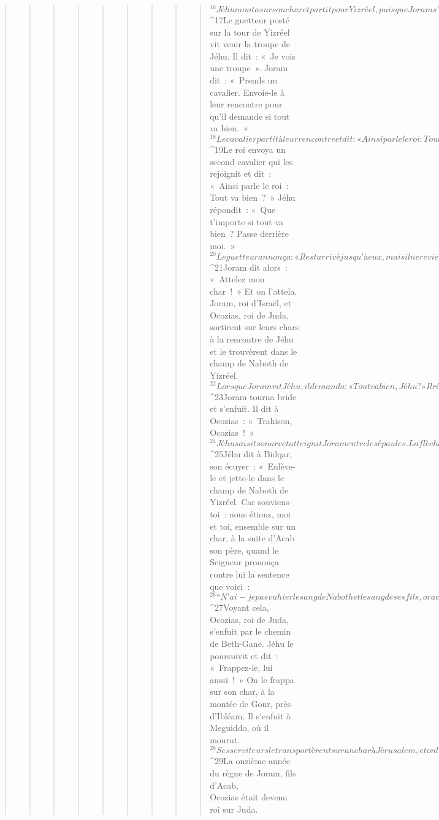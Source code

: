 \begin{verse}
\begin{verse}
\begin{verse}
\begin{verse}
\begin{verse}
\begin{verse}
\begin{verse}
\begin{verse}
\begin{verse}
${}^{16}Jéhu monta sur son char et partit pour Yizréel, puisque Joram s’y trouvait alité. Ocozias, roi de Juda, était descendu voir Joram. 
${}^{17}Le guetteur posté sur la tour de Yizréel vit venir la troupe de Jéhu. Il dit : « Je vois une troupe ». Joram dit : « Prends un cavalier. Envoie-le à leur rencontre pour qu’il demande si tout va bien. » 
${}^{18}Le cavalier partit à leur rencontre et dit : « Ainsi parle le roi : Tout va bien ? » Jéhu répondit : « Que t’importe si tout va bien ? Passe derrière moi. » Le guetteur annonça : « Le messager est arrivé jusqu’à eux, mais il ne revient pas. » 
${}^{19}Le roi envoya un second cavalier qui les rejoignit et dit : « Ainsi parle le roi : Tout va bien ? » Jéhu répondit : « Que t’importe si tout va bien ? Passe derrière moi. » 
${}^{20}Le guetteur annonça : « Il est arrivé jusqu’à eux, mais il ne revient pas. La façon de conduire le char est celle de Jéhu, fils de Namsi, car il conduit comme un fou ! » 
${}^{21}Joram dit alors : « Attelez mon char ! » Et on l’attela. Joram, roi d’Israël, et Ocozias, roi de Juda, sortirent sur leurs chars à la rencontre de Jéhu et le trouvèrent dans le champ de Naboth de Yizréel. 
${}^{22}Lorsque Joram vit Jéhu, il demanda : « Tout va bien, Jéhu ? » Il répondit : « Est-il possible que tout aille bien, aussi longtemps que durent les débauches de ta mère Jézabel et ses nombreuses sorcelleries ? » 
${}^{23}Joram tourna bride et s’enfuit. Il dit à Ocozias : « Trahison, Ocozias ! » 
${}^{24}Jéhu saisit son arc et atteignit Joram entre les épaules. La flèche lui transperça le cœur, et il s’écroula dans son char. 
${}^{25}Jéhu dit à Bidqar, son écuyer : « Enlève-le et jette-le dans le champ de Naboth de Yizréel. Car souviens-toi : nous étions, moi et toi, ensemble sur un char, à la suite d’Acab son père, quand le Seigneur prononça contre lui la sentence que voici : 
${}^{26}“N’ai-je pas vu hier le sang de Naboth et le sang de ses fils, oracle du Seigneur ? Je te le ferai payer dans ce champ – oracle du Seigneur !” Maintenant donc, enlève Joram et jette-le dans ce champ, selon la parole du Seigneur. »
${}^{27}Voyant cela, Ocozias, roi de Juda, s’enfuit par le chemin de Beth-Gane. Jéhu le poursuivit et dit : « Frappez-le, lui aussi ! » On le frappa sur son char, à la montée de Gour, près d’Ibléam. Il s’enfuit à Meguiddo, où il mourut. 
${}^{28}Ses serviteurs le transportèrent sur un char à Jérusalem, et on l’ensevelit dans son tombeau avec ses pères, dans la Cité de David.
${}^{29}La onzième année du règne de Joram, fils d’Acab,
        \\Ocozias était devenu roi sur Juda.

\end{verse}
\end{verse}
\end{verse}
\end{verse}
\end{verse}
\end{verse}
\end{verse}
\end{verse}
\end{verse}
